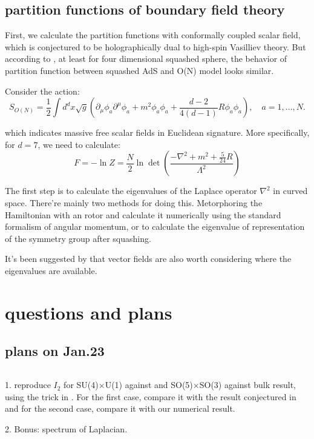 \documentclass[12pt, a4paper]{article}
\numberwithin{equation}{section}
\newcommand{\be}{\begin{equation}}
\newcommand{\ee}{\end{equation}}
\begin{document}
	


\subsection{partition functions of boundary field theory}
First, we calculate the partition functions with conformally coupled scalar field, which is conjectured to be holographically dual to high-spin Vasilliev theory. But according to \cite{Bobev:2016sh}\cite{Hartnoll:2005kc}, at least for four dimensional squashed sphere, the behavior of partition function between squashed AdS and O(N) model looks similar. 

	Consider the action:\cite{Manvelyan:2007pl}
\be
	S_{O(N)} = \frac{1}{2}\int d^dx\sqrt{g}\left(\partial_\mu\phi_a\partial^\mu\phi_a+m^2\phi_a\phi_a+\frac{d-2}{4(d-1)}R\phi_a\phi_a\right),\quad a = 1,...,N.
\ee

	which indicates massive free scalar fields in Euclidean signature. More specifically, for $d=7$, we need to calculate:
\be
	F = -\ln Z = \frac{N}{2}\ln\det\left(\frac{-\nabla^2+m^2+\frac{5}{24}R}{\Lambda^2}\right)
\ee

	The first step is to calculate the eigenvalues of the Laplace operator $\nabla^2$ in curved space. There're mainly two methods for doing this. Metorphoring the Hamiltonian with an rotor and calculate it numerically using the standard formalism of angular momentum\cite{Hu:1973fb}, or to calculate the eigenvalue of representation of the symmetry group after squashing.\cite{Bobev:2017pf}
	
	It's been suggested by \cite{Dowker:1998ts} that vector fields are also worth considering where the eigenvalues are available.


\section{questions and plans}
\subsection{plans on Jan.23}
$ $

1. reproduce $I_2$ for SU(4)$\times$U(1) against \cite{Bobev:2017pf} and SO(5)$\times$SO(3) against bulk result, using the trick in \cite{Klebanov:2011fs}\cite{Cardy:1988fd}. For the first case, compare it with the result conjectured in \cite{Bueno:2018pf} and for the second case, compare it with our numerical result.

2. Bonus: spectrum of Laplacian.
\end{document}
